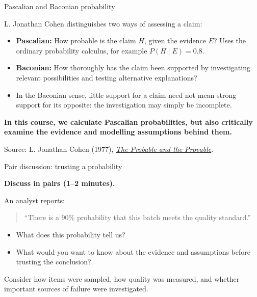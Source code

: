 \documentclass[10pt]{beamer}
\begin{document}
\begin{frame}{Pascalian and Baconian probability}

  L. Jonathan Cohen distinguishes two ways of assessing a claim:

  \begin{itemize}
  \item \textbf{Pascalian:} How probable is the claim $H$, given the
    evidence $E$? Uses the ordinary probability calculus, for example
    $P(H\mid E)=0.8$.
  \item \textbf{Baconian:} How thoroughly has the claim been supported
    by investigating relevant possibilities and testing alternative
    explanations?
  \item In the Baconian sense, little support for a claim need not mean
    strong support for its opposite: the investigation may simply be
    incomplete.
  \end{itemize}

  \medskip
  \textbf{In this course, we calculate Pascalian probabilities, but also
    critically examine the evidence and modelling assumptions behind them.}

  \medskip
  {\footnotesize Source: L. Jonathan Cohen (1977),
    \href{https://academic.oup.com/book/3708}{\textit{The Probable and the Provable}}.}

\end{frame}


\begin{frame}{Pair discussion: trusting a probability}

  {\color{uured}\textbf{Discuss in pairs (1--2 minutes).}}

  An analyst reports:

  \begin{quote}
    ``There is a 90\% probability that this batch meets the quality standard.''
  \end{quote}

  \begin{itemize}
  \item What does this probability tell us?
  \item What would you want to know about the evidence and assumptions
    before trusting the conclusion?
  \end{itemize}

  \medskip
  Consider how items were sampled, how quality was measured, and whether
  important sources of failure were investigated.

\end{frame}
\end{document}
